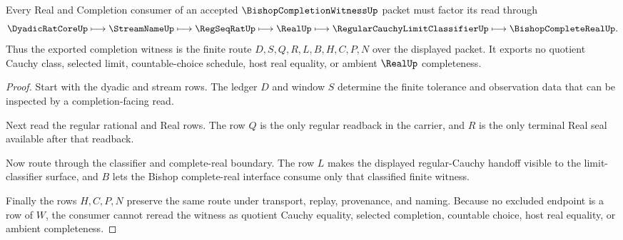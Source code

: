 \begin{theorem}
\label{thm:bishop-completion-witness-real-completion-handoff}
Every Real and Completion consumer of an accepted $\BishopCompletionWitnessUp$ packet must factor its read through
$$
\DyadicRatCoreUp \longmapsto \StreamNameUp \longmapsto \RegSeqRatUp \longmapsto \RealUp \longmapsto \RegularCauchyLimitClassifierUp \longmapsto \BishopCompleteRealUp .
$$
Thus the exported completion witness is the finite route $D,S,Q,R,L,B,H,C,P,N$ over the displayed packet. It exports no quotient Cauchy class, selected limit, countable-choice schedule, host real equality, or ambient $\RealUp$ completeness.
\end{theorem}
\begin{proof}
Start with the dyadic and stream rows. The ledger $D$ and window $S$ determine the finite tolerance and observation data that can be inspected by a completion-facing read.

Next read the regular rational and Real rows. The row $Q$ is the only regular readback in the carrier, and $R$ is the only terminal Real seal available after that readback.

Now route through the classifier and complete-real boundary. The row $L$ makes the displayed regular-Cauchy handoff visible to the limit-classifier surface, and $B$ lets the Bishop complete-real interface consume only that classified finite witness.

Finally the rows $H,C,P,N$ preserve the same route under transport, replay, provenance, and naming. Because no excluded endpoint is a row of $W$, the consumer cannot reread the witness as quotient Cauchy equality, selected completion, countable choice, host real equality, or ambient completeness.
\end{proof}




